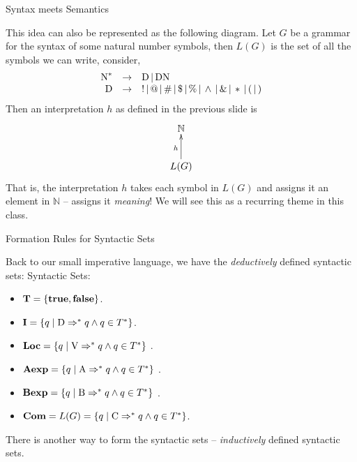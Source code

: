 \documentclass{beamer}
\begin{document}

\begin{frame}{Syntax meets Semantics}
\small

This idea can also be represented as the following diagram.  Let $G$ be a grammar for the syntax of some natural number symbols,
then $L(G)$ is the set of all the symbols we can write, consider,
{\scriptsize
\[
\begin{array}{rcl}
\mbox{N}^* &\rightarrow& \mbox{D} \,|\, \mbox{D}\mbox{N}\\
\mbox{D} &\rightarrow& ! \,|\, @ \,|\, \# \,|\, \$ \,|\, \% \,|\, \wedge \,|\, \& \,|\, * \,|\, ( \,|\, )
\end{array}
\]
}
Then an interpretation $h$ as defined in the previous slide is
\[
\xymatrix{
\mathbb{N}\\
L(G)\ar[u]^h
}
\]
That is, the interpretation $h$ takes each symbol in $L(G)$ and assigns it an element in $\mathbb{N}$ -- assigns it {\em meaning}!
We will see this as a recurring theme in this class.
\end{frame}


\begin{frame}{Formation Rules for Syntactic Sets}
\small

Back to our small imperative language, we have the {\em deductively} defined syntactic sets:
Syntactic Sets:
\begin{itemize}
\item $\mbox{\bf T} = \{  \mbox{\bf true} ,\mbox{\bf false} \}$.
\item $\mbox{\bf I} = \{ q \mid \mbox{D} \Rightarrow^* q \wedge q \in T^*\}$.
\item $\mbox{\bf Loc} = \{ q \mid \mbox{V} \Rightarrow^* q \wedge q \in T^*\}$ .
\item $\mbox{\bf Aexp} = \{ q \mid \mbox{A} \Rightarrow^* q \wedge q \in T^*\}$ .
\item $\mbox{\bf Bexp} = \{ q \mid \mbox{B} \Rightarrow^* q \wedge q \in T^*\}$ .
\item $\mbox{\bf Com} = L(G) = \{ q \mid \mbox{C} \Rightarrow^* q \wedge q \in T^*\}$.
\end{itemize}

There is another way to form the syntactic sets -- {\em inductively} defined syntactic sets.

\end{frame}
\end{document}

